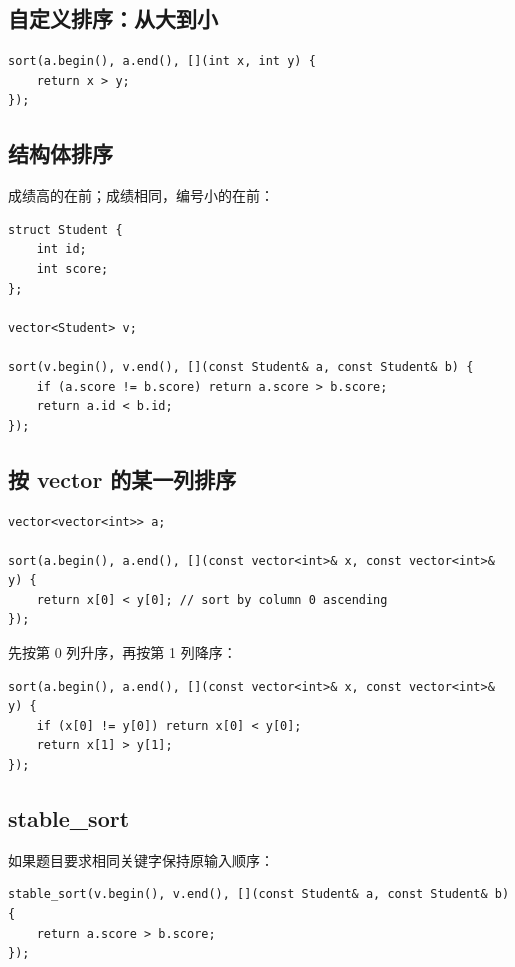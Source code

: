 \subsection{自定义排序：从大到小}

\begin{lstlisting}
sort(a.begin(), a.end(), [](int x, int y) {
    return x > y;
});
\end{lstlisting}

\subsection{结构体排序}

成绩高的在前；成绩相同，编号小的在前：

\begin{lstlisting}
struct Student {
    int id;
    int score;
};

vector<Student> v;

sort(v.begin(), v.end(), [](const Student& a, const Student& b) {
    if (a.score != b.score) return a.score > b.score;
    return a.id < b.id;
});
\end{lstlisting}

\subsection{按 vector 的某一列排序}

\begin{lstlisting}
vector<vector<int>> a;

sort(a.begin(), a.end(), [](const vector<int>& x, const vector<int>& y) {
    return x[0] < y[0]; // sort by column 0 ascending
});
\end{lstlisting}

先按第 0 列升序，再按第 1 列降序：

\begin{lstlisting}
sort(a.begin(), a.end(), [](const vector<int>& x, const vector<int>& y) {
    if (x[0] != y[0]) return x[0] < y[0];
    return x[1] > y[1];
});
\end{lstlisting}

\subsection{stable\_sort}

如果题目要求相同关键字保持原输入顺序：

\begin{lstlisting}
stable_sort(v.begin(), v.end(), [](const Student& a, const Student& b) {
    return a.score > b.score;
});
\end{lstlisting}


